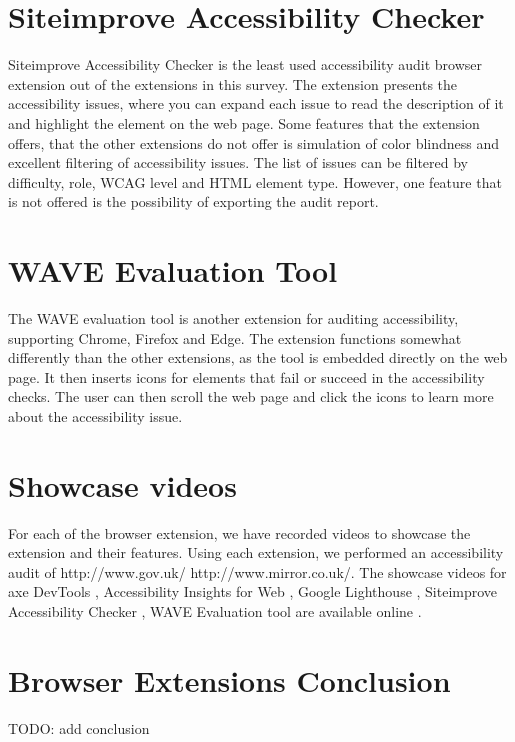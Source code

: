 \section{Siteimprove Accessibility Checker}
Siteimprove Accessibility Checker is the least used accessibility audit browser extension out of the extensions in this survey.
The extension presents the accessibility issues, where you can expand each issue to read the description of it and highlight the element on the web page.
Some features that the extension offers, that the other extensions do not offer is simulation of color blindness and excellent filtering of accessibility issues.
The list of issues can be filtered by difficulty, role, WCAG level and HTML element type.
However, one feature that is not offered is the possibility of exporting the audit report.

\section{WAVE Evaluation Tool}
The WAVE evaluation tool is another extension for auditing accessibility, supporting Chrome, Firefox and Edge.
The extension functions somewhat differently than the other extensions, as the tool is embedded directly on the web page.
It then inserts icons for elements that fail or succeed in the accessibility checks.
The user can then scroll the web page and click the icons to learn more about the accessibility issue.

\section{Showcase videos}
For each of the browser extension, we have recorded videos to showcase the extension and their features.
Using each extension, we performed an accessibility audit of http://www.gov.uk/ http://www.mirror.co.uk/.
The showcase videos for axe DevTools \parencite{axe_ext_vid}, Accessibility Insights for Web \parencite{aiweb_ext_vid}, Google Lighthouse \parencite{lighthouse_ext_vid}, Siteimprove Accessibility Checker \parencite{siteimprove_ext_vid}, WAVE Evaluation tool are available online \parencite{wave_ext_vid}.

\section{Browser Extensions Conclusion}
TODO: add conclusion

